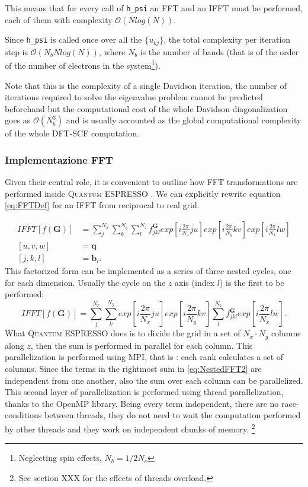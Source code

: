 \documentclass[a4paper,12pt]{article}
\newcommand\mf[1]{\mathbf{#1}}
\newcommand\GI{\mathbf{G}}
\newcommand\QE{\textsc{Quantum} ESPRESSO }
\newcommand\bigO{\mathcal{O}}
\begin{document}
This means that for every call of \texttt{h\_psi} an FFT and an IFFT must be performed, each of them with complexity $\bigO(N log (N))$. 

Since \texttt{h\_psi} is called once over all the $\{u_{kj}\}$, the total complexity per iteration step is $\bigO(N_{b} N log (N))$, where $N_{b}$ is the number of bands (that is of the order of the number of electrons in the system\footnote{Neglecting spin effects, $N_b = 1/2 N_e$}). 

Note that this is the complexity of a single Davidson iteration, the number of iterations required to solve the eigenvalue problem cannot be predicted beforehand but the computational cost of the whole Davidson diagonalization goes as $\bigO(N_{b}^3)$ and is usually accounted as the global computational complexity of the whole DFT-SCF computation.

\subsubsection{Implementazione FFT}
Given their central role, it is convenient to outline how FFT transformations are performed inside \QE .
We can explicitly rewrite equation \eqref{eq:FFTDef} for an IFFT from reciprocal to real grid.

\begin{align}
	IFFT[f(\GI)] &= \sum_{j}^{N_x} \sum_{k}^{N_y} \sum_{l}^{N_z} f^{\GI}_{jkl}
		exp \left[i \frac{2\pi}{N_x}ju \right] 
		exp \left[i \frac{2\pi}{N_y}kv \right] 
		exp \left[i \frac{2\pi}{N_x}lw \right] \\
		[u,v,w] &= \mf{q} \\
		[j,k,l] &= \mf{b}_i.
\end{align}
This factorized form can be implemented as a series of three nested cycles, one for each dimension.
Usually the cycle on the $z$ axis (index $l$) is the first to be performed:
\begin{equation}\label{eq:NestedFFT2}
	IFFT[f(\GI)] = \sum_{j}^{N_x} \sum_{k}^{N_y} 
		exp \left[i \frac{2\pi}{N_x}ju \right] 
		exp \left[i \frac{2\pi}{N_y}kv \right] 
		\sum_{l}^{N_z} 	f^{\GI}_{jkl} exp \left[i \frac{2\pi}{N_x}lw \right].
\end{equation}
What \QE does is to divide the grid in a set of $N_x \cdot N_y$ columns along $z$, then the sum is performed in parallel for each column. This parallelization is performed using MPI, that is : each rank calculates a set of columns.
Since the terms in the rightmost sum in \eqref{eq:NestedFFT2} are independent from one another, also the sum over each column can be parallelized. 
This second layer of parallelization is performed using thread parallelization, thanks to the OpenMP library.
Being every term independent, there are no race-conditions between threads, they do not need to wait the computation performed by other threads and they work on independent chunks of memory. \footnote{See section XXX for the effects of threads overload.}
\end{document}
